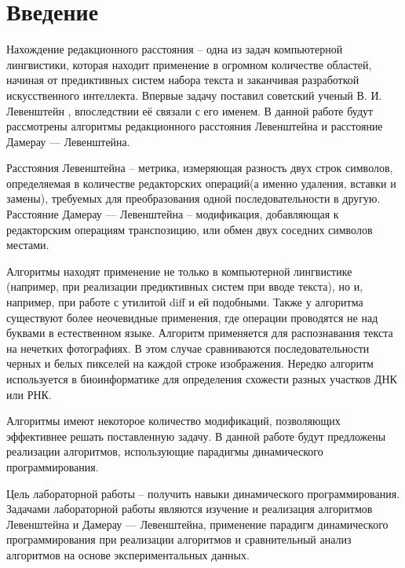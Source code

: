 \chapter{Введение}

Нахождение редакционного расстояния -- одна из задач компьютерной лингвистики, которая находит применение в огромном количестве областей, начиная от предиктивных систем набора текста и заканчивая разработкой искусственного интеллекта. Впервые задачу поставил советский ученый В. И. Левенштейн \cite{Lev1965}, впоследствии её связали с его именем. В данной работе будут рассмотрены алгоритмы редакционного расстояния Левенштейна и расстояние Дамерау — Левенштейна.

Расстояния Левенштейна -- метрика, измеряющая разность двух строк символов, определяемая в количестве редакторских операций(а именно удаления, вставки и замены), требуемых для преобразования одной последовательности в другую.  Расстояние Дамерау — Левенштейна -- модификация, добавляющая к редакторским операциям транспозицию, или обмен двух соседних символов местами.

Алгоритмы находят применение не только в компьютерной лингвистике (например, при реализации предиктивных систем при вводе текста), но и, например, при работе с утилитой diff и ей подобными. Также у алгоритма существуют более неочевидные применения, где операции проводятся не над буквами в естественном языке. Алгоритм применяется для распознавания текста на нечетких фотографиях. В этом случае сравниваются последовательности черных и белых пикселей на каждой строке изображения.
Нередко алгоритм используется в биоинформатике для определения схожести разных участков ДНК или РНК.

Алгоритмы имеют некоторое количество модификаций, позволяющих эффективнее решать поставленную задачу. В данной работе будут предложены реализации алгоритмов, использующие парадигмы динамического программирования.

Цель лабораторной работы -- получить навыки динамического программирования. 
Задачами лабораторной работы являются изучение и реализация алгоритмов Левенштейна и Дамерау — Левенштейна, применение парадигм динамического программирования при реализации алгоритмов и сравнительный анализ алгоритмов на основе экспериментальных данных.
